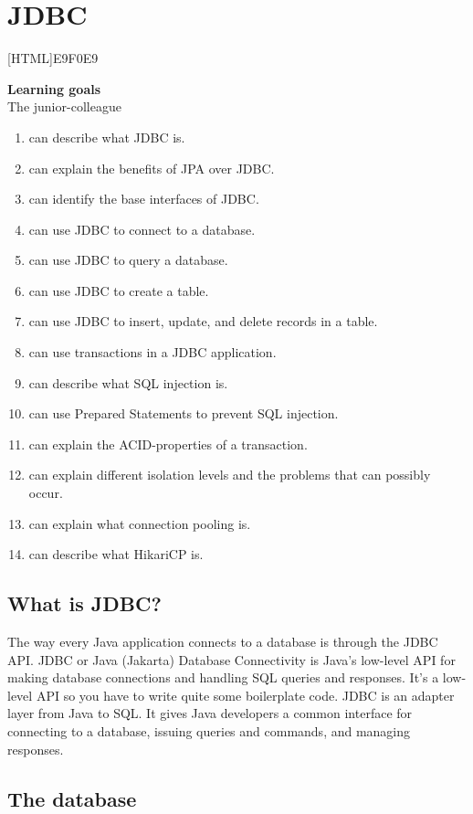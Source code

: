 \chapter{JDBC}
\label{chap:jdbc}

[HTML]{E9F0E9}{\parbox{\textwidth}{%
\noindent \textbf{Learning goals}\\
The junior-colleague
\begin{enumerate}[nolistsep]
\item can describe what JDBC is.
\item can explain the benefits of JPA over JDBC.
\item can identify the base interfaces of JDBC.
\item can use JDBC to connect to a database.
\item can use JDBC to query a database.
\item can use JDBC to create a table.
\item can use JDBC to insert, update, and delete records in a table.
\item can use transactions in a JDBC application.
\item can describe what SQL injection is.
\item can use Prepared Statements to prevent SQL injection.
\item can explain the ACID-properties of a transaction.
\item can explain different isolation levels and the problems that can possibly occur.
\item can explain what connection pooling is.
\item can describe what HikariCP is.
\end{enumerate}}}

\section{What is JDBC?}

The way every Java application connects to a database is through the JDBC API.
JDBC or Java (Jakarta) Database Connectivity is Java's low-level API for making database connections and handling SQL queries and responses. It's a low-level API so you have to write quite some boilerplate code.
JDBC is an adapter layer from Java to SQL. It gives Java developers a common interface for connecting to a database, issuing queries and commands, and managing responses.


\section{The database}

